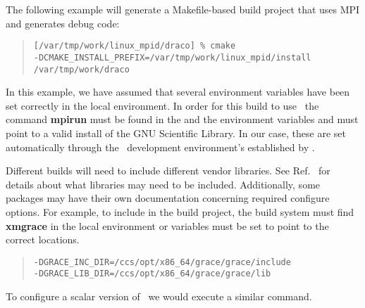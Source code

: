 The following example will generate a Makefile-based build project
that uses MPI and generates debug code:

\footnotesize
\begin{verse}
\texttt{[/var/tmp/work/linux\_mpid/draco] \% cmake \\
  \hspace{0.5in}-DCMAKE\_INSTALL\_PREFIX=/var/tmp/work/linux\_mpid/install
  /var/tmp/work/draco} \\
\end{verse}
\normalsize

In this example, we have assumed that several environment variables
have been set correctly in the local environment.  In order for this
build to use \openmpi\, the command \textbf{mpirun} must be found in
the  and the environment variables 
and  must point to a valid install of the GNU
Scientific Library.  In our case, these are set automatically through
the \draco\ development environment's established by .

Different builds will need to include different vendor libraries.  See
Ref.~\cite{draco-build} for details about what libraries may need to
be included.  Additionally, some packages may have their own
documentation concerning required configure options.  For example, to
include  in the build project, the build system must
find \textbf{xmgrace} in the local environment or variables must be
set to point to the correct locations.

\footnotesize
\begin{verse}
\texttt{-DGRACE\_INC\_DIR=/ccs/opt/x86\_64/grace/grace/include \\
-DGRACE\_LIB\_DIR=/ccs/opt/x86\_64/grace/grace/lib}
\end{verse}
\normalsize

To configure a scalar version of \draco\ we would execute a similar command.

